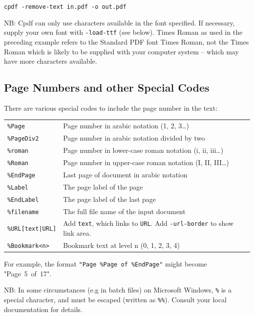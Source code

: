 \documentclass{book}
\begin{document}
  \begin{framed}
    \noindent\small\verb!cpdf -remove-text in.pdf -o out.pdf!
  \end{framed}

\noindent NB: Cpdf can only use characters available in the font specified. If necessary, supply your own font with \texttt{-load-ttf} (see below). Times Roman as used in the preceding example refers to the Standard PDF font Times Roman, not the Times Roman which is likely to be supplied with your computer system -- which may have more characters available.

  \subsection{Page Numbers and other Special Codes}
  There are various special codes to include the page number in the text:

  \vspace{2mm}
  \begin{tabular}{ll}
    \texttt{\%Page} & Page number in arabic notation (1, 2, 3\ldots) \\
    \texttt{\%PageDiv2} & Page number in arabic notation divided by two \\
    \texttt{\%roman} & Page number in lower-case roman notation (i, ii, iii\ldots) \\
    \texttt{\%Roman} & Page number in upper-case roman notation (I, II, III\ldots) \\
    \texttt{\%EndPage} & Last page of document in arabic notation \\
    \texttt{\%Label} & The page label of the page \\
    \texttt{\%EndLabel} & The page label of the last page \\
    \texttt{\%filename} & The full file name of the input document \\
    \texttt{\%URL[text|URL]} & Add \texttt{text}, which links to \texttt{URL}. Add \texttt{-url-border} to show link area.\\
    \texttt{\%Bookmark<n>} & Bookmark text at level n (0, 1, 2, 3, 4)\\
  \end{tabular}

  \vspace{2mm}
  \noindent For example, the format \texttt{"Page~\%Page~of~\%EndPage"} might become "Page~5~of~17".

  NB: In some circumstances (e.g in batch files) on Microsoft Windows, \verb!%! is a special character, and must be escaped (written as \verb$%%$). Consult your local documentation for details.
\end{document}
